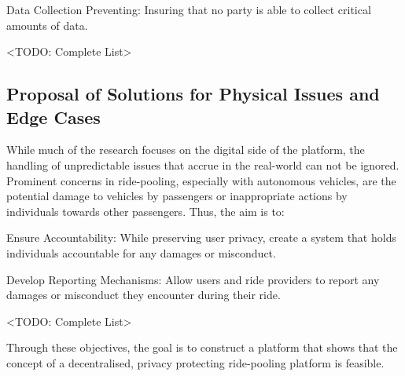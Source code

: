 Data Collection Preventing: Insuring that no party is able to collect critical amounts of data.

<TODO: Complete List>

\subsection{Proposal of Solutions for Physical Issues and Edge Cases}

While much of the research focuses on the digital side of the platform, the handling of unpredictable issues that accrue in the real-world can not be ignored. Prominent concerns in ride-pooling, especially with autonomous vehicles, are the potential damage to vehicles by passengers or inappropriate actions by individuals towards other passengers. Thus, the aim is to:

Ensure Accountability: While preserving user privacy, create a system that holds individuals accountable for any damages or misconduct.

Develop Reporting Mechanisms: Allow users and ride providers to report any damages or misconduct they encounter during their ride.

<TODO: Complete List>

 Through these objectives, the goal is to construct a platform that shows that the concept of a decentralised, privacy protecting ride-pooling platform is feasible.